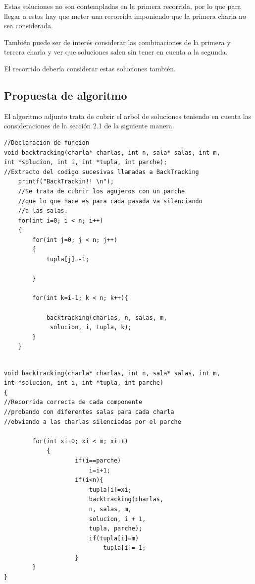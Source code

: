 \documentclass[11pt]{article}
\begin{document}
Estas soluciones no son contempladas en la primera recorrida, por lo que para llegar a estas hay que meter una recorrida imponiendo que la primera charla no sea considerada.

También puede ser de interés considerar las combinaciones de la primera y tercera charla y ver que soluciones salen sin tener en cuenta a la segunda.

\begin{center}
\end{center}

El recorrido debería considerar estas soluciones también. \newpage

\subsection{Propuesta de algoritmo}

El algoritmo adjunto trata de cubrir el arbol de soluciones teniendo en cuenta las consideraciones de la sección 2.1 de la siguiente manera.


\begin{lstlisting}
//Declaracion de funcion
void backtracking(charla* charlas, int n, sala* salas, int m, 
int *solucion, int i, int *tupla, int parche);
//Extracto del codigo sucesivas llamadas a BackTracking
	printf("BackTrackin!! \n");
	//Se trata de cubrir los agujeros con un parche
	//que lo que hace es para cada pasada va silenciando
	//a las salas.
	for(int i=0; i < n; i++)
	{
		for(int j=0; j < n; j++)
		{
			tupla[j]=-1;

		}

 		for(int k=i-1; k < n; k++){
 
			backtracking(charlas, n, salas, m,
			 solucion, i, tupla, k);
		}
	}
	
\end{lstlisting}
\newpage
\begin{lstlisting}
void backtracking(charla* charlas, int n, sala* salas, int m, 
int *solucion, int i, int *tupla, int parche)
{
//Recorrida correcta de cada componente
//probando con diferentes salas para cada charla
//obviando a las charlas silenciadas por el parche

		for(int xi=0; xi < m; xi++)
			{
					if(i==parche)
						i=i+1;
					if(i<n){
						tupla[i]=xi;
						backtracking(charlas, 
						n, salas, m, 
						solucion, i + 1, 
						tupla, parche);
						if(tupla[i]=m)
							tupla[i]=-1;							
					}
		}
}

\end{lstlisting}
\end{document}
